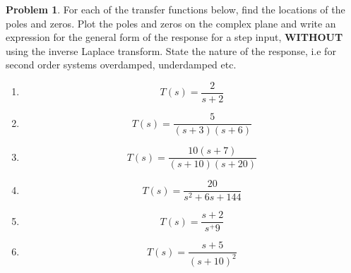 \documentclass[10pt]{article}
\theoremstyle{definition}
\newtheorem{prob}{Problem}[section]
\newenvironment{subprob}%
{\renewcommand{\theenumi}{\alph{enumi}}\renewcommand{\labelenumi}{(\theenumi)}\begin{enumerate}}%
{\end{enumerate}}%
\begin{document}
\begin{prob}
    For each of the transfer functions below, find the locations of the poles and zeros.
    Plot the poles and zeros on the complex plane and write an expression for the general form of the response for a step input, \textbf{WITHOUT} using the inverse Laplace transform.
    State the nature of the response, i.e  for second order systems overdamped, underdamped etc.

    \begin{subprob}
        \item \[ T(s) = \frac{2}{s+2}\]
        \item \[ T(s) = \frac{5}{(s+3)(s+6)}\]
        \item \[ T(s) = \frac{10(s+7)}{(s+10)(s+20)}\]
        \item \[ T(s) = \frac{20}{s^2 + 6s + 144}\]
        \item \[ T(s) = \frac{s+2}{s^+9}\]
        \item \[ T(s) = \frac{s+5}{(s+10)^2}\]
    \end{subprob}
\end{prob}
\end{document}

